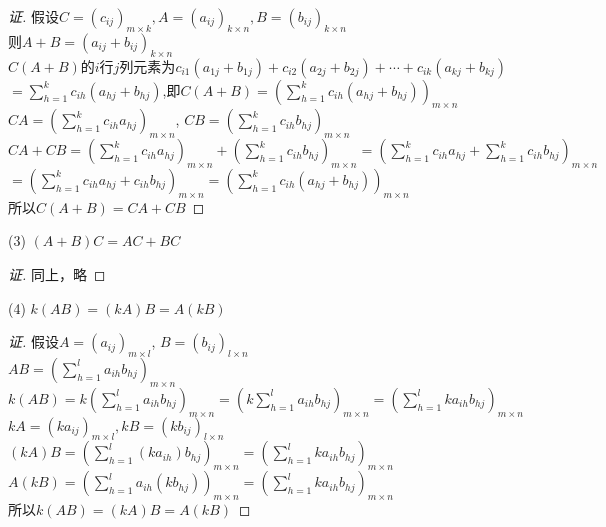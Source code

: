 \documentclass[10pt,a4paper]{report}
\begin{document}
\begin{proof}[证]
	假设$C = (c_{ij})_{m \times k}, A = (a_{ij})_{k \times n}, B = (b_{ij})_{k \times n}$\\
	则$A+B = (a_{ij} + b_{ij})_{k \times n}$\\
	$C(A+B)$的$i$行$j$列元素为$c_{i1}(a_{1j}+b_{1j})+c_{i2}(a_{2j}+b_{2j})+ \cdots + c_{ik}(a_{kj}+b_{kj})$\\
	$= \sum\limits_{h=1}^{k}c_{ih}(a_{hj}+b_{hj})$,即$C(A+B) = (\sum\limits_{h=1}^{k}c_{ih}(a_{hj}+b_{hj}))_{m \times n}$\\
	$CA = (\sum\limits_{h=1}^{k}c_{ih}a_{hj})_{m \times n}$, $CB = (\sum\limits_{h=1}^{k}c_{ih}b_{hj})_{m \times n}$\\
	$CA+CB=(\sum\limits_{h=1}^{k}c_{ih}a_{hj})_{m \times n}+(\sum\limits_{h=1}^{k}c_{ih}b_{hj})_{m \times n} = (\sum\limits_{h=1}^{k}c_{ih}a_{hj}+\sum\limits_{h=1}^{k}c_{ih}b_{hj})_{m \times n}$\\
	$= (\sum\limits_{h=1}^{k}c_{ih}a_{hj}+c_{ih}b_{hj})_{m \times n} = (\sum\limits_{h=1}^{k}c_{ih}(a_{hj}+b_{hj}))_{m \times n}$\\
	所以$C(A+B) = CA+CB$
\end{proof}
\noindent (3) $(A+B)C = AC+BC$
\begin{proof}[证]
	同上，略
\end{proof}
\noindent (4) $k(AB) = (kA)B = A(kB)$
\begin{proof}[证]
	假设$A = (a_{ij})_{m \times l}$, $B = (b_{ij})_{l \times n}$\\
	$AB = (\sum\limits_{h=1}^{l}a_{ih}b_{hj})_{m \times n}$\\
	$k(AB) = k(\sum\limits_{h=1}^{l}a_{ih}b_{hj})_{m \times n} = (k\sum\limits_{h=1}^{l}a_{ih}b_{hj})_{m \times n} = (\sum\limits_{h=1}^{l}ka_{ih}b_{hj})_{m \times n}$\\
	$kA = (ka_{ij})_{m \times l}, kB = (kb_{ij})_{l \times n}$\\
	$(kA)B = (\sum\limits_{h=1}^{l}(ka_{ih})b_{hj})_{m \times n} = (\sum\limits_{h=1}^{l}ka_{ih}b_{hj})_{m \times n}$\\
	$A(kB) = (\sum\limits_{h=1}^{l}a_{ih}(kb_{hj}))_{m \times n} = (\sum\limits_{h=1}^{l}ka_{ih}b_{hj})_{m \times n}$\\
	所以$k(AB) = (kA)B = A(kB)$
\end{proof}
\end{document}

